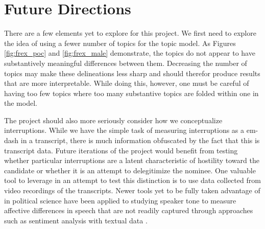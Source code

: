 \documentclass [12pt]{article}
\begin{document}
    
\section{Future Directions}
There are a few elements yet to explore for this project. We first need to explore the idea of using a fewer number of topics for the topic model. As Figures \ref{fig:frex_poc} and \ref{fig:frex_male} demonstrate, the topics do not appear to have substantively meaningful differences between them. Decreasing the number of topics may make these delineations less sharp and should therefor produce results that are more interpretable. While doing this, however, one must be careful of having too few topics where too many substantive topics are folded within one in the model. 

The project should also more seriously consider how we conceptualize interruptions. While we have the simple task of measuring interruptions as a em-dash in a transcript, there is much information obfuscated by the fact that this is transcript data. Future iterations of the project would benefit from testing whether particular interruptions are a latent characteristic of hostility toward the candidate or whether it is an attempt to delegitimize the nominee. One valuable tool to leverage in an attempt to test this distinction is to use data collected from video recordings of the transcripts. Newer tools yet to be fully taken advantage of in political science have been applied to studying speaker tone to measure affective differences in speech that are not readily captured through approaches such as sentiment analysis with textual data \citep{Knox2021c}.

\newpage


\end{document}
